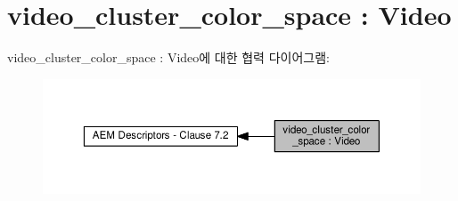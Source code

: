 \hypertarget{group__video__cluster__color__space}{}\section{video\+\_\+cluster\+\_\+color\+\_\+space \+: Video}
\label{group__video__cluster__color__space}
video\+\_\+cluster\+\_\+color\+\_\+space \+: Video에 대한 협력 다이어그램\+:
\nopagebreak
\begin{figure}[H]
\begin{center}
\leavevmode
\includegraphics[width=350pt]{group__video__cluster__color__space}
\end{center}
\end{figure}
